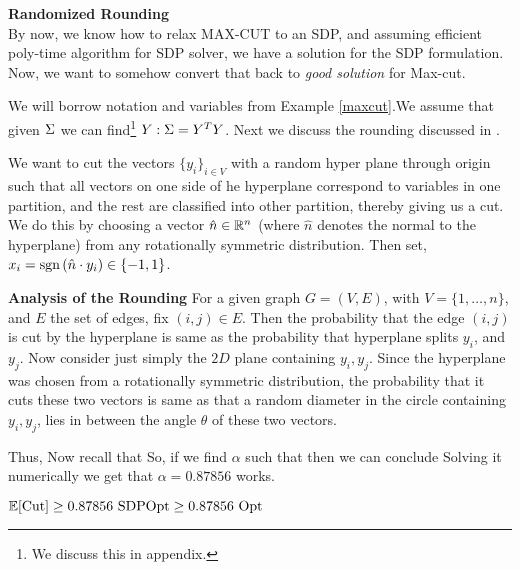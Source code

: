 \begin{example}{\bf Randomized Rounding \cite{gwFirstMaxCutSDP}}\\
By now, we know how to relax MAX-CUT to an SDP, and assuming efficient poly-time algorithm for SDP solver, we have a solution for the SDP formulation. Now, we want to somehow convert that back to \textit{good solution} for Max-cut. 

We will borrow notation and variables from Example \ref{maxcut}.We assume that given $\Sigma$ we can find\footnote{We discuss this in appendix.} $Y : \Sigma = Y^T Y$. 
Next we discuss the rounding discussed in \cite{gwFirstMaxCutSDP}. 

We want to cut the vectors $\{y_i\}_{i \in V}$ with a random hyper plane through origin such that all vectors on one side of he hyperplane correspond to variables in one partition, and the rest are classified into other partition, thereby giving us a cut. 
We do this by choosing a vector $\hat{n} \in \mathbb{R}^n$ (where $\hat{n}$ denotes the normal to the hyperplane) from any rotationally symmetric distribution. Then set, $x_i = \mbox{sgn}\left(\hat{n} \cdot y_i\right) \in \{-1, 1 \}$.

{\bf Analysis of the Rounding} 
For a given graph $G = (V, E)$, with $V =\{1, \ldots, n\}$, and $E$ the set of edges, fix $(i, j) \in E$. Then the probability that the edge $(i, j)$ is cut by the hyperplane is same as the probability that hyperplane splits $y_i$, and $y_j$. 
Now consider just simply the $2D$ plane containing $y_i, y_j$. Since the hyperplane was chosen from a rotationally symmetric distribution, the probability that it cuts these two vectors is same as that a random diameter in the circle containing $y_i, y_j$, lies in between the angle $\theta$ of these two vectors.

Thus, 
Now recall that 
So, if we find $\alpha$ such that 
then we can conclude 
Solving it numerically we get that $\alpha = 0.87856$ works.
\begin{remark}
$\Ex[\mbox{Cut}]  \geq 0.87856 \mbox{\ SDPOpt} \geq 0.87856 \mbox{\ Opt }$
\end{remark} 
\end{example}
 
